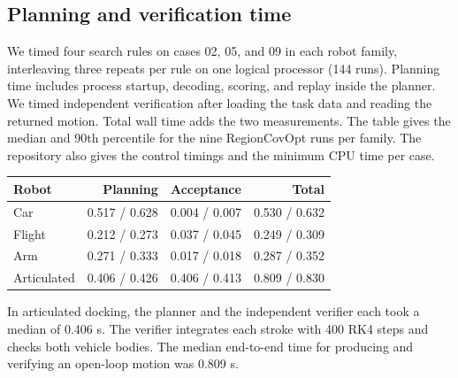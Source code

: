 \subsection{Planning and verification time}

We timed four search rules on cases 02, 05, and 09 in each robot family, interleaving three repeats per rule on one logical processor (144 runs). Planning time includes process startup, decoding, scoring, and replay inside the planner. We timed independent verification after loading the task data and reading the returned motion. Total wall time adds the two measurements. The table gives the median and 90th percentile for the nine RegionCovOpt runs per family. The repository also gives the control timings and the minimum CPU time per case.

\begin{center}\begin{minipage}{\linewidth}\centering\small


\begin{tabular}{@{}lrrr@{}}\toprule Robot & Planning & Acceptance & Total\\\midrule

Car & 0.517 / 0.628 & 0.004 / 0.007 & 0.530 / 0.632\\

Flight & 0.212 / 0.273 & 0.037 / 0.045 & 0.249 / 0.309\\

Arm & 0.271 / 0.333 & 0.017 / 0.018 & 0.287 / 0.352\\

Articulated & 0.406 / 0.426 & 0.406 / 0.413 & 0.809 / 0.830\\

\bottomrule\end{tabular}\end{minipage}\end{center}

In articulated docking, the planner and the independent verifier each took a median of 0.406 s. The verifier integrates each stroke with 400 RK4 steps and checks both vehicle bodies. The median end-to-end time for producing and verifying an open-loop motion was 0.809 s.
